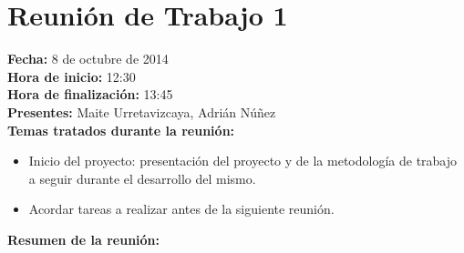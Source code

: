 \section*{Reunión de Trabajo 1}

\textbf{Fecha:} 8 de octubre de 2014\\

\textbf{Hora de inicio:} 12:30\\

\textbf{Hora de finalización:} 13:45\\

\textbf{Presentes:} Maite Urretavizcaya, Adrián Núñez\\

\textbf{Temas tratados durante la reunión:}

\begin{itemize}
\item Inicio del proyecto: presentación del proyecto y de la metodología de trabajo a seguir durante el desarrollo del 	mismo.
\item Acordar tareas a realizar antes de la siguiente reunión.
\end{itemize}

\textbf{Resumen de la reunión:}

